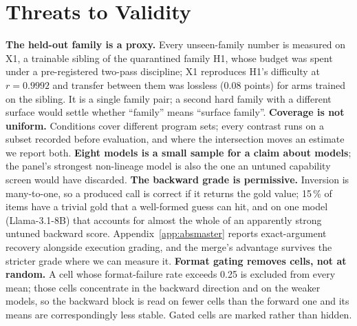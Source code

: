 \section{Threats to Validity}
\label{sec:threats}

\textbf{The held-out family is a proxy.} Every unseen-family number is measured on X1, a trainable
sibling of the quarantined family H1, whose budget was spent under a pre-registered two-pass
discipline; X1 reproduces H1's difficulty at $r = 0.9992$ and transfer between them was lossless
(0.08 points) for arms trained on the sibling. It is a single family pair; a second hard family with
a different surface would settle whether ``family'' means ``surface family''. \textbf{Coverage is not
uniform.} Conditions cover different program sets; every contrast runs on a subset recorded before
evaluation, and where the intersection moves an estimate we report both. \textbf{Eight models is a
small sample for a claim about models}; the panel's strongest non-lineage model is also the one an
untuned capability screen would have discarded. \textbf{The backward grade is permissive.} Inversion
is many-to-one, so a produced call is correct if it returns the gold value; 15\,\% of items have a
trivial gold that a well-formed guess can hit, and on one model (Llama-3.1-8B) that accounts for
almost the whole of an apparently strong untuned backward score. Appendix~\ref{app:absmaster} reports
exact-argument recovery alongside execution grading, and the merge's advantage survives the stricter
grade where we can measure it. \textbf{Format gating removes cells, not at random.} A cell whose
format-failure rate exceeds 0.25 is excluded from every mean; those cells concentrate in the backward
direction and on the weaker models, so the backward block is read on fewer cells than the forward one
and its means are correspondingly less stable. Gated cells are marked rather than hidden.
